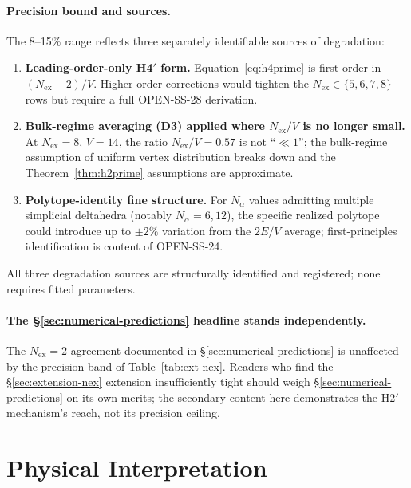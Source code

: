 \documentclass[11pt,letterpaper]{article}
\theoremstyle{definition}
\newcommand{\Nalpha}{N_\alpha}
\newcommand{\Nex}{N_{\text{ex}}}
\begin{document}
\paragraph{Precision bound and sources.}

The 8--15\% range reflects three separately identifiable sources of degradation:

\begin{enumerate}
  \item \textbf{Leading-order-only H4$'$ form.} Equation~\eqref{eq:h4prime} is first-order in $(\Nex - 2)/V$. Higher-order corrections would tighten the $\Nex \in \{5, 6, 7, 8\}$ rows but require a full OPEN-SS-28 derivation.
  \item \textbf{Bulk-regime averaging (D3) applied where $\Nex/V$ is no longer small.} At $\Nex = 8$, $V = 14$, the ratio $\Nex/V = 0.57$ is not ``$\ll 1$''; the bulk-regime assumption of uniform vertex distribution breaks down and the Theorem~\ref{thm:h2prime} assumptions are approximate.
  \item \textbf{Polytope-identity fine structure.} For $\Nalpha$ values admitting multiple simplicial deltahedra (notably $\Nalpha = 6, 12$), the specific realized polytope could introduce up to $\pm 2\%$ variation from the $2E/V$ average; first-principles identification is content of OPEN-SS-24.
\end{enumerate}

All three degradation sources are structurally identified and registered; none requires fitted parameters.

\paragraph{The \S\ref{sec:numerical-predictions} headline stands independently.}

The $\Nex = 2$ agreement documented in \S\ref{sec:numerical-predictions} is unaffected by the precision band of Table~\ref{tab:ext-nex}. Readers who find the \S\ref{sec:extension-nex} extension insufficiently tight should weigh \S\ref{sec:numerical-predictions} on its own merits; the secondary content here demonstrates the H2$'$ mechanism's reach, not its precision ceiling.


\section{Physical Interpretation}
\label{sec:physical-interpretation}
\end{document}
